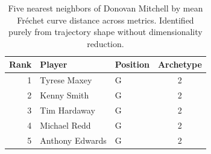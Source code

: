 \begin{table}[htbp]
  \centering\small
  \begin{tabular}{rllc}
    \toprule
    Rank & Player & Position & Archetype \\
    \midrule
    1 & Tyrese Maxey & G & 2 \\
    2 & Kenny Smith & G & 2 \\
    3 & Tim Hardaway & G & 2 \\
    4 & Michael Redd & G & 2 \\
    5 & Anthony Edwards & G & 2 \\
    \bottomrule
  \end{tabular}
  \caption{Five nearest neighbors of Donovan Mitchell by mean Fr\'{e}chet curve distance across metrics. Identified purely from trajectory shape without dimensionality reduction.}
  \label{tab:Donovan_Mitchell_frechet_curve_neighbors}
\end{table}

